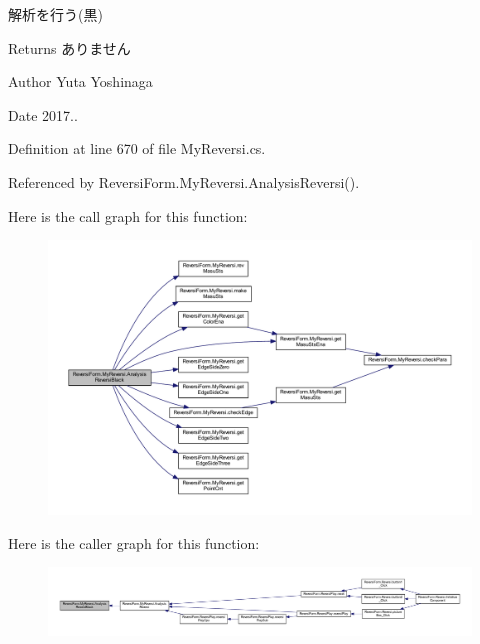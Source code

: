 解析を行う(黒) 

\begin{DoxyReturn}{Returns}
ありません 
\end{DoxyReturn}
\begin{DoxyAuthor}{Author}
Yuta Yoshinaga 
\end{DoxyAuthor}
\begin{DoxyDate}{Date}
2017.. 
\end{DoxyDate}


Definition at line 670 of file My\+Reversi.\+cs.



Referenced by Reversi\+Form.\+My\+Reversi.\+Analysis\+Reversi().

Here is the call graph for this function\+:\nopagebreak
\begin{figure}[H]
\begin{center}
\leavevmode
\includegraphics[width=350pt]{class_reversi_form_1_1_my_reversi_adfa9fda128ee816da9b32009326c5a15_cgraph}
\end{center}
\end{figure}
Here is the caller graph for this function\+:\nopagebreak
\begin{figure}[H]
\begin{center}
\leavevmode
\includegraphics[width=350pt]{class_reversi_form_1_1_my_reversi_adfa9fda128ee816da9b32009326c5a15_icgraph}
\end{center}
\end{figure}
\mbox{\label{class_reversi_form_1_1_my_reversi_a2fac17b7121d91063e2d759487f1ed18}} 
